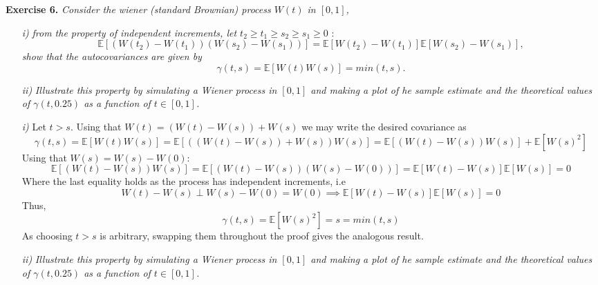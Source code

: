 
\textbf{Exercise 6. }\emph{Consider the wiener (standard Brownian) process \( W(t) \)  in \( [0, 1] \),}
\begin{itemize}
  \item[\textit{i)}] \emph{from the property of independent increments, let \( t_{2} \geq t_{1} \geq s_{2} \geq s_{1} \geq 0 \) }:
        \[
        \mathbb{E}[(W(t_{2}) - W(t_{1}))(W(s_{2}) - W(s_{1}))] = \mathbb{E}[W(t_{2}) - W(t_{1})]\mathbb{E}[W(s_{2}) - W(s_{1})],
        \]
        \emph{show that the autocovariances are given by}
        \[
        \gamma(t, s) = \mathbb{E}[W(t)W(s)] = min(t,s).
        \]
        \item[\textit{ii)}] \emph{Illustrate this property by simulating a Wiener process in \( [0 ,1] \) and making a plot of he sample estimate and the theoretical values of \( \gamma(t, 0.25) \) as a function of \( t \in [0, 1] \).}
\end{itemize}


\begin{itemize}
  \item[\textit{i)}] Let \( t > s \). Using that \( W(t) = (W(t) - W(s)) + W(s) \) we may write the desired covariance as
        \[
        \gamma(t, s) = \mathbb{E}[W(t)W(s)] = \mathbb{E}[ ((W(t) - W(s)) + W(s))W(s)] = \mathbb{E}[(W(t) - W(s))W(s)] + \mathbb{E}[W(s)^{2}]
        \]
        Using that \( W(s) = W(s) - W(0) \):
        \[
        \mathbb{E}[(W(t) - W(s))W(s)] = \mathbb{E}[(W(t) - W(s))(W(s) - W(0))] = \mathbb{E}[W(t) - W(s)]\mathbb{E}[W(s)] = 0
        \]
        Where the last equality holds as the process has independent increments, i.e
        \[
        W(t) - W(s) \perp W(s) - W(0) = W(0) \implies \mathbb{E}[W(t) - W(s)]\mathbb{E}[W(s)] = 0
        \]
        Thus,
        \[
        \gamma(t, s) = \mathbb{E}[W(s)^{2}] = s = min(t, s)
        \]
        As choosing \( t > s \) is arbitrary, swapping them throughout the proof gives the analogous result.

        \item[\textit{ii)}] \emph{Illustrate this property by simulating a Wiener process in \( [0 ,1] \) and making a plot of he sample estimate and the theoretical values of \( \gamma(t, 0.25) \) as a function of \( t \in [0, 1] \).}
\end{itemize}
